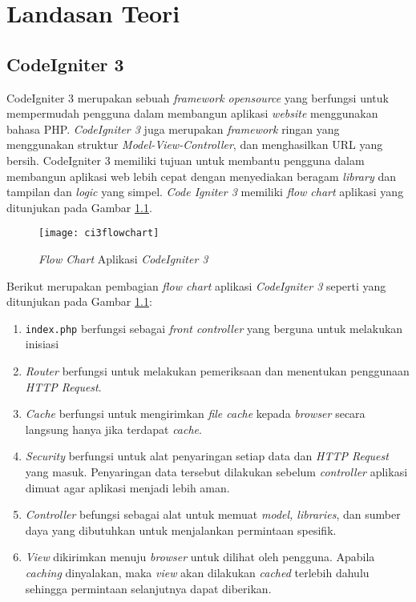 \chapter{Landasan Teori}
\label{chap:teori}

\section{CodeIgniter 3 \cite{ci3:22}}
\label{sec:ci3} 
 
CodeIgniter 3 merupakan sebuah \textit{framework opensource} yang berfungsi untuk mempermudah pengguna dalam membangun aplikasi \textit{website} menggunakan bahasa PHP. \textit{CodeIgniter 3} juga merupakan \textit{framework} ringan yang menggunakan struktur \textit{Model-View-Controller}, dan menghasilkan URL yang bersih. CodeIgniter 3 memiliki tujuan untuk membantu pengguna dalam membangun aplikasi web lebih cepat dengan menyediakan beragam \textit{library} dan tampilan dan \textit{logic} yang simpel. \textit{Code Igniter 3} memiliki \textit{flow chart} aplikasi yang ditunjukan pada Gambar \ref{fig:ci3flowchart}.

\begin{figure}[H]
	\centering  
	\texttt{[image: ci3flowchart]}  
	\caption[\textit{Flow Chart} Aplikasi \textit{CodeIgniter 3}]{\textit{Flow Chart} Aplikasi \textit{CodeIgniter 3}} 
	\label{fig:ci3flowchart} 
\end{figure} 

Berikut merupakan pembagian \textit{flow chart} aplikasi \textit{CodeIgniter 3} seperti yang ditunjukan pada Gambar \ref{fig:ci3flowchart}:
\begin{enumerate}
\item \texttt{index.php} berfungsi sebagai \textit{front controller} yang berguna untuk melakukan inisiasi
\item \textit{Router} berfungsi untuk melakukan pemeriksaan dan menentukan penggunaan \textit{HTTP Request}.
\item \textit{Cache} berfungsi untuk mengirimkan \textit{file cache} kepada \textit{browser} secara langsung hanya jika terdapat \textit{cache}.   
\item \textit{Security} berfungsi untuk alat penyaringan setiap data dan \textit{HTTP Request} yang masuk. Penyaringan data tersebut dilakukan sebelum \textit{controller} aplikasi dimuat agar aplikasi menjadi lebih aman.
\item \textit{Controller} befungsi sebagai alat untuk memuat \textit{model, libraries}, dan sumber daya yang dibutuhkan untuk menjalankan permintaan spesifik.
\item \textit{View} dikirimkan menuju \textit{browser} untuk dilihat oleh pengguna. Apabila \textit{caching} dinyalakan, maka \textit{view} akan dilakukan \textit{cached} terlebih dahulu sehingga permintaan selanjutnya dapat diberikan.
\end{enumerate}

